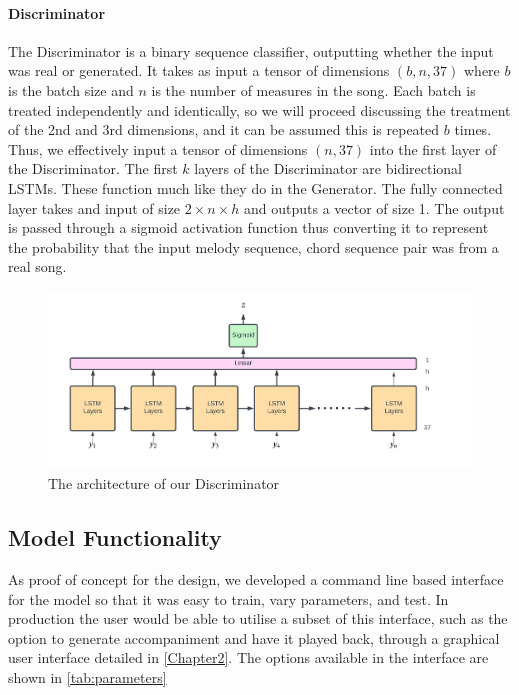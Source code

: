 \paragraph{Discriminator}
The Discriminator is a binary sequence classifier, outputting whether the input was real or generated.
It takes as input a tensor of dimensions $(b,n,37)$ where $b$ is the batch size and $n$ is the number of measures in the song.
Each batch is treated independently and identically, so we will proceed discussing the treatment of the 2nd and 3rd dimensions, and it can be assumed this is repeated $b$ times.
Thus, we effectively input a tensor of dimensions $(n,37)$ into the first layer of the Discriminator.
The first $k$ layers of the Discriminator are bidirectional LSTMs. 
These function much like they do in the Generator.
The fully connected layer takes and input of size $2 \times n \times h$ and outputs a vector of size 1.
The output is passed through a sigmoid activation function thus converting it to represent the probability that the input melody sequence, chord sequence pair was from a real song.

\begin{figure}
    \centering
    \includegraphics[width=0.8\columnwidth]{Figures/Discriminator}
    \decoRule
    \caption{The architecture of our Discriminator}
    \label{fig:Discriminator}
\end{figure}


\subsection{Model Functionality}

As proof of concept for the design, we developed a command line based interface for the model so that it was easy to train, vary parameters, and test. 
In production the user would be able to utilise a subset of this interface, such as the option to generate accompaniment and have it played back, through a graphical user interface detailed in \cref{Chapter2}.
The options available in the interface are shown in \cref{tab:parameters}

